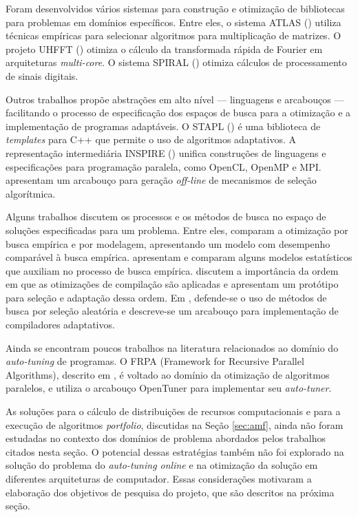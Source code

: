 \documentclass[a4paper, 12pt]{article}
\begin{document}
Foram desenvolvidos vários sistemas para construção e otimização de bibliotecas
para problemas em domínios específicos. Entre eles, o sistema ATLAS
(\citet{whaley1998, whaley2005}) utiliza técnicas empíricas para selecionar
algoritmos para multiplicação de matrizes. O projeto UHFFT
(\citet{ali2007scheduling}) otimiza o cálculo da transformada rápida
de Fourier em arquiteturas \emph{multi-core}. O sistema SPIRAL
(\citet{puschel2005spiral}) otimiza cálculos de processamento de sinais
digitais.

Outros trabalhos propõe abstrações em alto nível --- linguagens e arcabouços
--- facilitando o processo de especificação dos espaços de busca para a
otimização e a implementação de programas adaptáveis. O STAPL
(\citet{thomas2005stapl}) é uma biblioteca de \emph{templates} para C++
que permite o uso de algoritmos adaptativos. A representação intermediária
INSPIRE (\citet{jordan2013inspire}) unifica construções de linguagens e
especificações para programação paralela, como OpenCL, OpenMP e MPI.
\citet{yu2004adaptive} apresentam um arcabouço para geração \emph{off-line}
de mecanismos de seleção algorítmica.

Alguns trabalhos discutem os processos e os métodos de busca no espaço
de soluções especificadas para um problema. Entre eles,
\citet{yotov2003} comparam a otimização por busca empírica e por
modelagem, apresentando um modelo com desempenho comparável à busca empírica.
\citet{vuduc2004} apresentam e comparam alguns
modelos estatísticos que auxiliam no processo de busca empírica.
\citet{cooper2002compilation} discutem a importância da
ordem em que as otimizações de compilação são aplicadas e apresentam
um protótipo para seleção e adaptação dessa ordem.
Em \citet{cooper2002adaptive}, defende-se o uso de métodos de busca
por seleção aleatória e descreve-se um arcabouço para implementação
de compiladores adaptativos.

Ainda se encontram poucos trabalhos na literatura relacionados ao domínio
do \emph{auto-tuning} de programas. O FRPA (Framework for Recursive Parallel
Algorithms), descrito em \citet{eliahu2015frpa}, é voltado ao domínio da
otimização de algoritmos paralelos, e utiliza o arcabouço OpenTuner para
implementar seu \emph{auto-tuner}.

As soluções para o cálculo de distribuições de recursos computacionais e
para a execução de algoritmos \emph{portfolio}, discutidas na Seção
\ref{sec:amf}, ainda não foram estudadas no contexto dos domínios de problema
abordados pelos trabalhos citados nesta seção.
O potencial dessas estratégias também não foi explorado na solução do
problema do \emph{auto-tuning online} e na otimização da solução em diferentes
arquiteturas de computador. Essas considerações motivaram a elaboração dos
objetivos de pesquisa do projeto, que são descritos na próxima seção.
\end{document}
